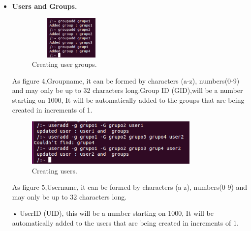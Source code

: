 \documentclass{aes2e}
\begin{document}
\begin{itemize}
\item \textbf{Users and Groups.}\newline

\begin{figure}[ht]
\centering
\includegraphics[width=10pc,height=5pc]{addgroups.eps}
\caption{Creating user groups.}
\end{figure}


As figure 4,Groupname, it can be formed by characters (a-z), numbers(0-9) and may only be up to 32 characters long.Group ID (GID),will be a number starting on 1000, It will be automatically added to the groups that are being created in increments of 1.\newline

\begin{figure}[ht]
\centering
\includegraphics[width=20pc]{addusers.eps}
\caption{Creating users.}
\end{figure}

As figure 5,Username, it can be formed by characters (a-z), numbers(0-9) and may only be up to 32 characters long.

• UserID (UID), this will be a number starting on 1000, It will be automatically added to the users that are being created in increments of 1.


\end{itemize}
\end{document}
